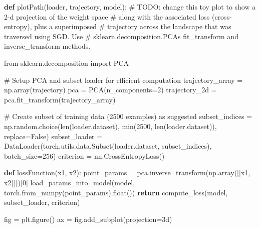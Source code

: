 \documentclass[
  letterpaper,
  DIV=11,
  numbers=noendperiod]{scrartcl}
\newenvironment{Shaded}{\begin{snugshade}}{\end{snugshade}}
\newcommand{\AlertTok}[1]{\textcolor[rgb]{0.68,0.00,0.00}{#1}}
\newcommand{\BuiltInTok}[1]{\textcolor[rgb]{0.00,0.23,0.31}{#1}}
\newcommand{\CommentTok}[1]{\textcolor[rgb]{0.37,0.37,0.37}{#1}}
\newcommand{\ControlFlowTok}[1]{\textcolor[rgb]{0.00,0.23,0.31}{\textbf{#1}}}
\newcommand{\DecValTok}[1]{\textcolor[rgb]{0.68,0.00,0.00}{#1}}
\newcommand{\ImportTok}[1]{\textcolor[rgb]{0.00,0.46,0.62}{#1}}
\newcommand{\KeywordTok}[1]{\textcolor[rgb]{0.00,0.23,0.31}{\textbf{#1}}}
\newcommand{\NormalTok}[1]{\textcolor[rgb]{0.00,0.23,0.31}{#1}}
\newcommand{\OperatorTok}[1]{\textcolor[rgb]{0.37,0.37,0.37}{#1}}
\newcommand{\StringTok}[1]{\textcolor[rgb]{0.13,0.47,0.30}{#1}}
\newcommand{\VariableTok}[1]{\textcolor[rgb]{0.07,0.07,0.07}{#1}}
\begin{document}
\begin{Shaded}
\begin{Highlighting}[]
\KeywordTok{def}\NormalTok{ plotPath(loader, trajectory, model):}
    \CommentTok{\# }\AlertTok{TODO}\CommentTok{: change this toy plot to show a 2{-}d projection of the weight space}
    \CommentTok{\# along with the associated loss (cross{-}entropy), plus a superimposed}
    \CommentTok{\# trajectory across the landscape that was traversed using SGD. Use}
    \CommentTok{\# sklearn.decomposition.PCA\textquotesingle{}s fit\_transform and inverse\_transform methods.}

    \ImportTok{from}\NormalTok{ sklearn.decomposition }\ImportTok{import}\NormalTok{ PCA}

    \CommentTok{\# Setup PCA and subset loader for efficient computation}
\NormalTok{    trajectory\_array }\OperatorTok{=}\NormalTok{ np.array(trajectory)}
\NormalTok{    pca }\OperatorTok{=}\NormalTok{ PCA(n\_components}\OperatorTok{=}\DecValTok{2}\NormalTok{)}
\NormalTok{    trajectory\_2d }\OperatorTok{=}\NormalTok{ pca.fit\_transform(trajectory\_array)}

    \CommentTok{\# Create subset of training data (2500 examples) as suggested}
\NormalTok{    subset\_indices }\OperatorTok{=}\NormalTok{ np.random.choice(}\BuiltInTok{len}\NormalTok{(loader.dataset), }\BuiltInTok{min}\NormalTok{(}\DecValTok{2500}\NormalTok{, }\BuiltInTok{len}\NormalTok{(loader.dataset)), replace}\OperatorTok{=}\VariableTok{False}\NormalTok{)}
\NormalTok{    subset\_loader }\OperatorTok{=}\NormalTok{ DataLoader(torch.utils.data.Subset(loader.dataset, subset\_indices), batch\_size}\OperatorTok{=}\DecValTok{256}\NormalTok{)}
\NormalTok{    criterion }\OperatorTok{=}\NormalTok{ nn.CrossEntropyLoss()}

    \KeywordTok{def}\NormalTok{ lossFunction(x1, x2):}
\NormalTok{        point\_params }\OperatorTok{=}\NormalTok{ pca.inverse\_transform(np.array([[x1, x2]]))[}\DecValTok{0}\NormalTok{]}
\NormalTok{        load\_params\_into\_model(model, torch.from\_numpy(point\_params).}\BuiltInTok{float}\NormalTok{())}
        \ControlFlowTok{return}\NormalTok{ compute\_loss(model, subset\_loader, criterion)}

\NormalTok{    fig }\OperatorTok{=}\NormalTok{ plt.figure()}
\NormalTok{    ax }\OperatorTok{=}\NormalTok{ fig.add\_subplot(projection}\OperatorTok{=}\StringTok{\textquotesingle{}3d\textquotesingle{}}\NormalTok{)}


\end{Highlighting}
\end{Shaded}
\end{document}
